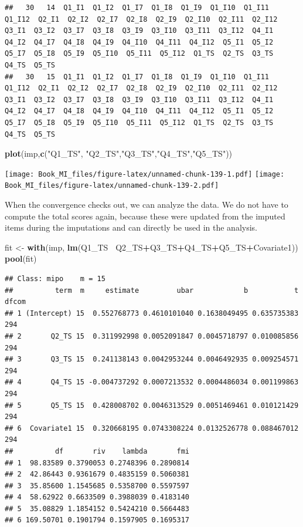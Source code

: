 \documentclass[
]{book}
\newenvironment{Shaded}{\begin{snugshade}}{\end{snugshade}}
\newcommand{\KeywordTok}[1]{\textcolor[rgb]{0.13,0.29,0.53}{\textbf{#1}}}
\newcommand{\NormalTok}[1]{#1}
\newcommand{\OperatorTok}[1]{\textcolor[rgb]{0.81,0.36,0.00}{\textbf{#1}}}
\newcommand{\StringTok}[1]{\textcolor[rgb]{0.31,0.60,0.02}{#1}}
\begin{document}
\begin{verbatim}
##   30   14  Q1_I1  Q1_I2  Q1_I7  Q1_I8  Q1_I9  Q1_I10  Q1_I11  Q1_I12  Q2_I1  Q2_I2  Q2_I7  Q2_I8  Q2_I9  Q2_I10  Q2_I11  Q2_I12  Q3_I1  Q3_I2  Q3_I7  Q3_I8  Q3_I9  Q3_I10  Q3_I11  Q3_I12  Q4_I1  Q4_I2  Q4_I7  Q4_I8  Q4_I9  Q4_I10  Q4_I11  Q4_I12  Q5_I1  Q5_I2  Q5_I7  Q5_I8  Q5_I9  Q5_I10  Q5_I11  Q5_I12  Q1_TS  Q2_TS  Q3_TS  Q4_TS  Q5_TS
##   30   15  Q1_I1  Q1_I2  Q1_I7  Q1_I8  Q1_I9  Q1_I10  Q1_I11  Q1_I12  Q2_I1  Q2_I2  Q2_I7  Q2_I8  Q2_I9  Q2_I10  Q2_I11  Q2_I12  Q3_I1  Q3_I2  Q3_I7  Q3_I8  Q3_I9  Q3_I10  Q3_I11  Q3_I12  Q4_I1  Q4_I2  Q4_I7  Q4_I8  Q4_I9  Q4_I10  Q4_I11  Q4_I12  Q5_I1  Q5_I2  Q5_I7  Q5_I8  Q5_I9  Q5_I10  Q5_I11  Q5_I12  Q1_TS  Q2_TS  Q3_TS  Q4_TS  Q5_TS
\end{verbatim}

\begin{Shaded}
\begin{Highlighting}[]
\KeywordTok{plot}\NormalTok{(imp,}\KeywordTok{c}\NormalTok{(}\StringTok{"Q1_TS"}\NormalTok{, }\StringTok{"Q2_TS"}\NormalTok{,}\StringTok{"Q3_TS"}\NormalTok{,}\StringTok{"Q4_TS"}\NormalTok{,}\StringTok{"Q5_TS"}\NormalTok{))}
\end{Highlighting}
\end{Shaded}

\texttt{[image: Book\_MI\_files/figure-latex/unnamed-chunk-139-1.pdf]}
\texttt{[image: Book\_MI\_files/figure-latex/unnamed-chunk-139-2.pdf]}

When the convergence checks out, we can analyze the data. We do not have
to compute the total scores again, because these were updated from the
imputed items during the imputations and can directly be used in the
analysis.

\begin{Shaded}
\begin{Highlighting}[]
\NormalTok{fit <-}\StringTok{ }\KeywordTok{with}\NormalTok{(imp, }\KeywordTok{lm}\NormalTok{(Q1_TS}\OperatorTok{~}\StringTok{ }\NormalTok{Q2_TS}\OperatorTok{+}\NormalTok{Q3_TS}\OperatorTok{+}\NormalTok{Q4_TS}\OperatorTok{+}\NormalTok{Q5_TS}\OperatorTok{+}\NormalTok{Covariate1))}
\KeywordTok{pool}\NormalTok{(fit)}
\end{Highlighting}
\end{Shaded}

\begin{verbatim}
## Class: mipo    m = 15 
##          term  m     estimate         ubar            b           t dfcom
## 1 (Intercept) 15  0.552768773 0.4610101040 0.1638049495 0.635735383   294
## 2       Q2_TS 15  0.311992998 0.0052091847 0.0045718797 0.010085856   294
## 3       Q3_TS 15  0.241138143 0.0042953244 0.0046492935 0.009254571   294
## 4       Q4_TS 15 -0.004737292 0.0007213532 0.0004486034 0.001199863   294
## 5       Q5_TS 15  0.428008702 0.0046313529 0.0051469461 0.010121429   294
## 6  Covariate1 15  0.320668195 0.0743308224 0.0132526778 0.088467012   294
##          df       riv    lambda       fmi
## 1  98.83589 0.3790053 0.2748396 0.2890814
## 2  42.86443 0.9361679 0.4835159 0.5060381
## 3  35.85600 1.1545685 0.5358700 0.5597597
## 4  58.62922 0.6633509 0.3988039 0.4183140
## 5  35.08829 1.1854152 0.5424210 0.5664483
## 6 169.50701 0.1901794 0.1597905 0.1695317
\end{verbatim}
\end{document}
